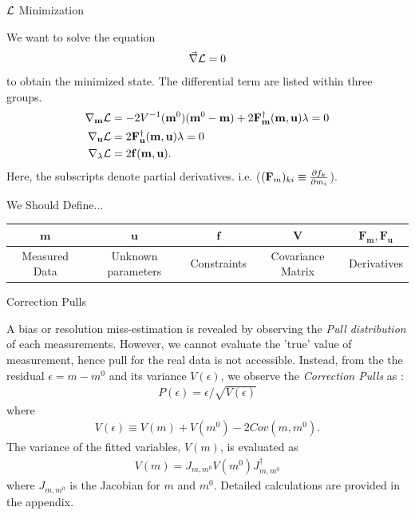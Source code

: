 \documentclass[
	xcolor=dvipsnames,
	aspectratio=169,	
	10pt, 
	]{beamer}
\begin{document}
\begin{frame}{$\mathcal{L}$ Minimization}
	\begin{block}{}
		We want to solve the equation
		\begin{align}
			\vec \nabla \mathcal{L} =0
		\end{align}
		to obtain the minimized state. The differential term are listed within three groups.
		\begin{align}
			\nabla_{\mathbf m}\mathcal{L} &= -2 V^{-1}(\mathbf m^0)(\mathbf m^0-\mathbf m) + 2 \mathbf F_\mathbf m^\dagger(\mathbf{m,u})\mathbf\lambda=0\label{GradM}\\
			\nabla_{\mathbf u}\mathcal{L} &= 2\mathbf F_\mathbf u^\dagger(\mathbf{m,u})\mathbf \lambda =0\label{GradU}\\
			\nabla_{\mathbf \lambda}\mathcal{L} &= 2\mathbf f(\mathbf{m,u})\label{GradL}.
		\end{align}
		Here, the subscripts denote partial derivatives. i.e. ($(\mathbf {F}_m)_{ki}\equiv\frac{\partial f_k}{\partial m_i}$).
	\end{block}
	\begin{block}{We Should Define...}
		\vspace{-5 mm}
		\begin{table}
			\begin{tabular}{c|c|c|c|c}
				$\mathbf{m}$&$\mathbf{u}$&$\mathbf{f}$&$\mathbf{V}$&$\mathbf{F_m},\mathbf{F_u}$\\\hline
				Measured Data&Unknown parameters&Constraints&Covariance Matrix&Derivatives
			\end{tabular}
		\end{table}
	\end{block}
\end{frame}
\begin{frame}{Correction Pulls}
	\begin{block}{}
		A bias or resolution miss-estimation is revealed by observing the \textit{Pull distribution} of each measurements. However, we cannot evaluate the 'true' value of measurement, hence pull for the real data is not accessible. Instead, from the the residual $\epsilon = m-m^0$ and its variance $V(\epsilon)$, we observe the \textit{Correction Pulls} as :
		\begin{align}
			P(\epsilon) = \epsilon/\sqrt{V(\epsilon)}\label{Pull}
		\end{align}
		where
		\begin{align}
			V(\epsilon) \equiv V(m)+ V(m^0) - 2 Cov(m,m^0).\label{Ve}
		\end{align}
		The variance of the fitted variables, $V(m)$, is evaluated as
		\begin{align}
			V(m) = J_{m,m^0}V(m^0) J^\dagger_{m,m^0} 
		\end{align}
		 where $J_{m,m^0}$ is the Jacobian for $m$ and $m^0$. Detailed calculations are provided in the appendix. 
	\end{block}
\end{frame} 
\end{document}
